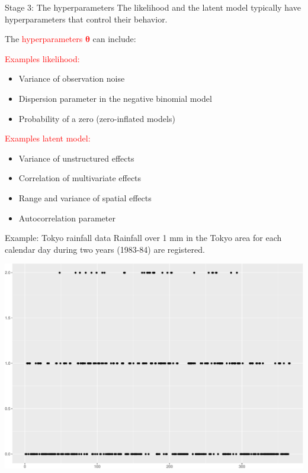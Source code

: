 \documentclass[
  ignorenonframetext,
]{beamer}
\providecommand{\tightlist}{%
  \setlength{\itemsep}{0pt}\setlength{\parskip}{0pt}}
\begin{document}
\begin{frame}{Stage 3: The hyperparameters}
\protect\hypertarget{stage-3-the-hyperparameters}{}
The likelihood and the latent model typically have hyperparameters that
control their behavior.

The \textcolor{red}{hyperparameters \(\boldsymbol{\theta}\)} can
include:

\pause

\textcolor{red}{Examples likelihood:}

\begin{itemize}
\tightlist
\item
  Variance of observation noise
\item
  Dispersion parameter in the negative binomial model
\item
  Probability of a zero (zero-inflated models)
\end{itemize}

\pause

\textcolor{red}{Examples latent model:}

\begin{itemize}
\tightlist
\item
  Variance of unstructured effects
\item
  Correlation of multivariate effects
\item
  Range and variance of spatial effects
\item
  Autocorrelation parameter
\end{itemize}
\end{frame}

\begin{frame}{Example: Tokyo rainfall data}
\protect\hypertarget{example-tokyo-rainfall-data}{}
Rainfall over 1 mm in the Tokyo area for each calendar day during two
years (1983-84) are registered.

\begin{center}\includegraphics[width=0.6\linewidth]{Part1_intro_files/figure-beamer/unnamed-chunk-10-1} \end{center}
\end{frame}
\end{document}
